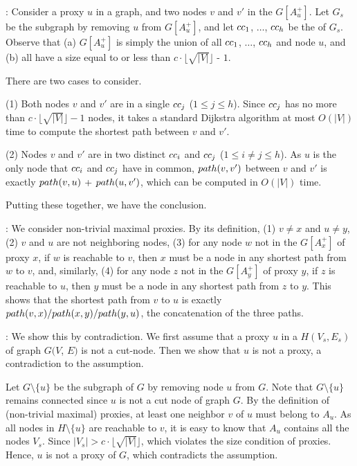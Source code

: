 :
Consider a proxy $u$ in a graph, and two nodes $v$ and $v'$ in the \dra $G[A^+_u]$.
%
Let $G_s$ be the subgraph by removing $u$ from $G[A^+_u]$, and let ${\sc cc}_{1}$, $\ldots$, ${\sc cc}_{h}$ be the \ccs of $G_s$.
Observe that (a)  $G[A^+_{u}]$ is simply the union of all \ccs ${\sc cc}_{1}$, $\ldots$, ${\sc cc}_{h}$ and node $u$, and (b)
all \ccs have a size equal to or less than $c\cdot\lfloor\sqrt{|V|}\rfloor$ - $1$.  

There are two cases to consider.

\noindent(1) Both nodes $v$ and $v'$ are in a single \cc ${\sc cc}_{j}$ ($1\le j\le h$).
Since \cc ${\sc cc}_{j}$ has no more than $c\cdot\lfloor\sqrt{|V|}\rfloor - 1$ nodes, it takes a standard Dijkstra algorithm at most $O(|V|)$ time to compute the shortest path between $v$ and $v'$.

\noindent(2) Nodes $v$ and $v'$ are in two distinct \ccs ${\sc cc}_{i}$ and ${\sc cc}_{j}$ ($1\le i\ne j\le h$).
As $u$ is the only node that ${\sc cc}_{i}$ and ${\sc cc}_{j}$ have in common, $\path(v,v')$ between $v$ and $v'$ is exactly $\path(v,u)$ + $\path(u,v')$, which can be computed in $O(|V|)$  time.

Putting these together, we have the conclusion.
\eop

:
We consider non-trivial maximal proxies. By its definition, (1) $v\neq x$ and $u\neq y$, (2) $v$ and $u$ are not neighboring nodes, (3)
for any node $w$ not in the \dra $G[A^+_{x}]$ of proxy $x$,  if $w$ is reachable to $v$, then $x$ must be a node in any shortest path from $w$ to $v$,
and, similarly, (4)  for any node $z$ not in the \dra $G[A^+_{y}]$ of proxy $y$,  if $z$ is reachable to $u$, then $y$ must be a node in any shortest path from $z$ to $y$.
%
This shows that the shortest path from $v$ to $u$ is exactly $\path(v, x)/\path(x, y)/\path(y, u)$, \ie the concatenation of the three paths.
\eop


:
We show this by contradiction. We first assume that a proxy $u$ in a \cc $H(V_s, E_s)$ of graph $G(V$, $E)$ is not a cut-node.  Then we show that $u$ is not a proxy, a contradiction to the assumption.

Let $G\setminus\{u\}$ be the subgraph of $G$ by removing node $u$ from $G$.  Note that $G\setminus\{u\}$ remains connected since $u$ is not a cut node of graph $G$. By the definition of (non-trivial maximal) proxies, at least one neighbor $v$ of $u$ must belong to $A_{u}$.  As all nodes in $H\setminus\{u\}$ are reachable to $v$, it is easy to know that $A_{u}$ contains all the nodes $V_s$.  Since $|V_s| > c\cdot\lfloor\sqrt{|V|}\rfloor$, which violates the size condition of proxies. Hence, $u$ is not a proxy of $G$, which contradicts the assumption.
\eop


